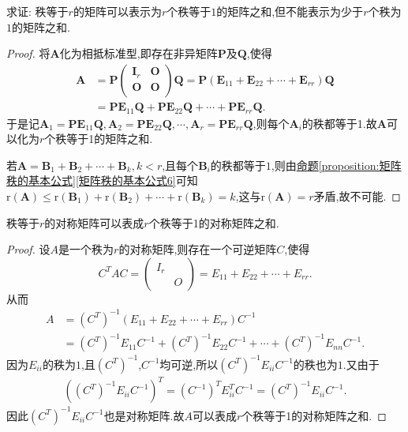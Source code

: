 \documentclass[lang=cn,newtx,10pt,scheme=chinese]{elegantbook}
\begin{document}
\begin{proposition}[矩阵的秩1分解]\label{proposition:矩阵的秩1分解}
求证: 秩等于\(r\)的矩阵可以表示为\(r\)个秩等于\(1\)的矩阵之和,但不能表示为少于\(r\)个秩为\(1\)的矩阵之和.
\end{proposition}
\begin{proof}
将\(\boldsymbol{A}\)化为相抵标准型,即存在非异矩阵\(\boldsymbol{P}\)及\(\boldsymbol{Q}\),使得
\begin{align*}
\boldsymbol{A}&=\boldsymbol{P}\left( \begin{matrix}
\boldsymbol{I}_r&		\boldsymbol{O}\\
\boldsymbol{O}&		\boldsymbol{O}\\
\end{matrix} \right) \boldsymbol{Q}=\boldsymbol{P}\left( \boldsymbol{E}_{11}+\boldsymbol{E}_{22}+\cdots +\boldsymbol{E}_{rr} \right) \boldsymbol{Q}
\\
&=\boldsymbol{PE}_{11}\boldsymbol{Q}+\boldsymbol{PE}_{22}\boldsymbol{Q}+\cdots +\boldsymbol{PE}_{rr}\boldsymbol{Q}.
\end{align*}
于是记$\boldsymbol{A}_1=\boldsymbol{PE}_{11}\boldsymbol{Q},\boldsymbol{A}_2=\boldsymbol{PE}_{22}\boldsymbol{Q},\cdots ,\boldsymbol{A}_r=\boldsymbol{PE}_{rr}\boldsymbol{Q}$,则每个$\boldsymbol{A}_i$的秩都等于1.故$\boldsymbol{A}$可以化为$r$个秩等于1的矩阵之和.

若\(\boldsymbol{A}=\boldsymbol{B}_1+\boldsymbol{B}_2+\cdots+\boldsymbol{B}_k,k < r\),且每个\(\boldsymbol{B}_i\)的秩都等于\(1\),则由\hyperref[矩阵秩的基本公式6]{命题\ref{proposition:矩阵秩的基本公式}\ref{矩阵秩的基本公式6}}可知\(\mathrm{r}(\boldsymbol{A})\leq\mathrm{r}(\boldsymbol{B}_1)+\mathrm{r}(\boldsymbol{B}_2)+\cdots+\mathrm{r}(\boldsymbol{B}_k)=k\),这与\(\mathrm{r}(\boldsymbol{A}) = r\)矛盾,故不可能.
\end{proof}

\begin{proposition}[对称矩阵的秩1分解]\label{proposition:对称矩阵的秩1分解}
秩等于$r$的对称矩阵可以表成$r$个秩等于1的对称矩阵之和.
\end{proposition}
\begin{proof}
设\(A\)是一个秩为\(r\)的对称矩阵,则存在一个可逆矩阵\(C\),使得
\[
C^TAC = \left( \begin{matrix}
I_r & \\
& O
\end{matrix} \right) = E_{11} + E_{22} + \cdots + E_{rr}.
\]
从而
\begin{align*}
A &= (C^T)^{-1}(E_{11} + E_{22} + \cdots + E_{rr})C^{-1}
\\
&=(C^T)^{-1}E_{11}C^{-1} + (C^T)^{-1}E_{22}C^{-1} + \cdots + (C^T)^{-1}E_{nn}C^{-1}.
\end{align*}
因为\(E_{ii}\)的秩为\(1\),且\((C^T)^{-1}\),\(C^{-1}\)均可逆,所以\((C^T)^{-1}E_{ii}C^{-1}\)的秩也为\(1\).又由于
\begin{align*}
((C^T)^{-1}E_{ii}C^{-1})^T = (C^{-1})^TE_{ii}^TC^{-1} = (C^T)^{-1}E_{ii}C^{-1}.
\end{align*}
因此\((C^T)^{-1}E_{ii}C^{-1}\)也是对称矩阵.故$A$可以表成$r$个秩等于1的对称矩阵之和.
\end{proof}
\end{document}
